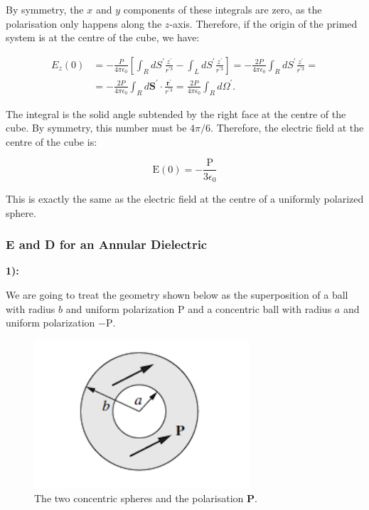 By symmetry, the $x$ and $y$ components of these integrals are zero, as the polarisation only happens along the $z$-axis. Therefore, if the origin of the primed system is at the centre of the cube, we have:

\begin{equation}
	\begin{split}
		E_{z}(0) &=-\frac{P}{4 \pi \epsilon_{0}}\left[\int_{R} d S^{\prime} \frac{z^{\prime}}{r^{\prime 3}}-\int_{L} d S^{\prime} \frac{z^{\prime}}{r^{\prime 3}}\right]=-\frac{2 P}{4 \pi \epsilon_{0}} \int_{R} d S^{\prime} \frac{z^{\prime}}{r^{\prime 3}}= \\
		&=-\frac{2 P}{4 \pi \epsilon_{0}} \int_{R} d \mathbf{S}^{\prime} \cdot \frac{\mathbf{r}^{\prime}}{r^{\prime 3}}=\frac{2 P}{4 \pi \epsilon_{0}} \int_{R} d \Omega^{\prime} .
	\end{split}
\end{equation}

The integral is the solid angle subtended by the right face at the centre of the cube. By symmetry, this number must be $4 \pi / 6 .$ Therefore, the electric field at the centre of the cube is:

\begin{equation}
	\mathrm{E}(0)=-\frac{\mathrm{P}}{3 \epsilon_{0}}
\end{equation}

This is exactly the same as the electric field at the centre of a uniformly polarized sphere.


\subsubsection{E and D for an Annular Dielectric}\label{E and D for an Annular Dielectric}

\textbf{1):}

We are going to treat the geometry shown below as the superposition of a ball with radius $b$ and uniform polarization $\mathrm{P}$ and a concentric ball with radius $a$ and uniform polarization $-\mathrm{P}$.

\begin{figure}[h!]
	\includegraphics[width=8cm]{figures/PolarisatedBall.png}
	\centering
	\caption{The two concentric spheres and the polarisation $\mathbf{P}$.}
\end{figure}

